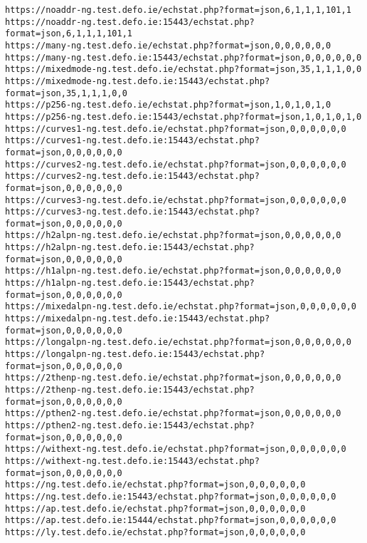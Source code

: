 \begin{verbatim}
https://noaddr-ng.test.defo.ie/echstat.php?format=json,6,1,1,1,101,1
https://noaddr-ng.test.defo.ie:15443/echstat.php?format=json,6,1,1,1,101,1
https://many-ng.test.defo.ie/echstat.php?format=json,0,0,0,0,0,0
https://many-ng.test.defo.ie:15443/echstat.php?format=json,0,0,0,0,0,0
https://mixedmode-ng.test.defo.ie/echstat.php?format=json,35,1,1,1,0,0
https://mixedmode-ng.test.defo.ie:15443/echstat.php?format=json,35,1,1,1,0,0
https://p256-ng.test.defo.ie/echstat.php?format=json,1,0,1,0,1,0
https://p256-ng.test.defo.ie:15443/echstat.php?format=json,1,0,1,0,1,0
https://curves1-ng.test.defo.ie/echstat.php?format=json,0,0,0,0,0,0
https://curves1-ng.test.defo.ie:15443/echstat.php?format=json,0,0,0,0,0,0
https://curves2-ng.test.defo.ie/echstat.php?format=json,0,0,0,0,0,0
https://curves2-ng.test.defo.ie:15443/echstat.php?format=json,0,0,0,0,0,0
https://curves3-ng.test.defo.ie/echstat.php?format=json,0,0,0,0,0,0
https://curves3-ng.test.defo.ie:15443/echstat.php?format=json,0,0,0,0,0,0
https://h2alpn-ng.test.defo.ie/echstat.php?format=json,0,0,0,0,0,0
https://h2alpn-ng.test.defo.ie:15443/echstat.php?format=json,0,0,0,0,0,0
https://h1alpn-ng.test.defo.ie/echstat.php?format=json,0,0,0,0,0,0
https://h1alpn-ng.test.defo.ie:15443/echstat.php?format=json,0,0,0,0,0,0
https://mixedalpn-ng.test.defo.ie/echstat.php?format=json,0,0,0,0,0,0
https://mixedalpn-ng.test.defo.ie:15443/echstat.php?format=json,0,0,0,0,0,0
https://longalpn-ng.test.defo.ie/echstat.php?format=json,0,0,0,0,0,0
https://longalpn-ng.test.defo.ie:15443/echstat.php?format=json,0,0,0,0,0,0
https://2thenp-ng.test.defo.ie/echstat.php?format=json,0,0,0,0,0,0
https://2thenp-ng.test.defo.ie:15443/echstat.php?format=json,0,0,0,0,0,0
https://pthen2-ng.test.defo.ie/echstat.php?format=json,0,0,0,0,0,0
https://pthen2-ng.test.defo.ie:15443/echstat.php?format=json,0,0,0,0,0,0
https://withext-ng.test.defo.ie/echstat.php?format=json,0,0,0,0,0,0
https://withext-ng.test.defo.ie:15443/echstat.php?format=json,0,0,0,0,0,0
https://ng.test.defo.ie/echstat.php?format=json,0,0,0,0,0,0
https://ng.test.defo.ie:15443/echstat.php?format=json,0,0,0,0,0,0
https://ap.test.defo.ie/echstat.php?format=json,0,0,0,0,0,0
https://ap.test.defo.ie:15444/echstat.php?format=json,0,0,0,0,0,0
https://ly.test.defo.ie/echstat.php?format=json,0,0,0,0,0,0
\end{verbatim}
\normalsize
